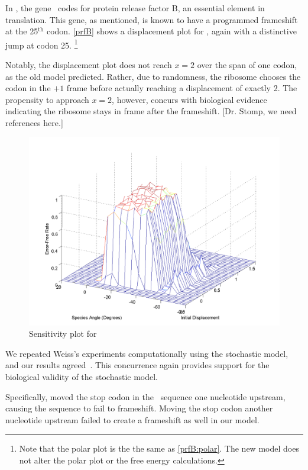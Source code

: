 \documentclass[12pt, draft]{article}
\numberwithin{equation}{section}
\begin{document}
In \ecoli, the gene \prfB\ codes for protein release factor B, an
essential element in translation.  This gene, as mentioned, is known
to have a programmed frameshift at the 25$^{\textrm{th}}$ codon.
\autoref{prfB} shows a displacement plot for
\prfB, again with a distinctive jump at codon 25.
\footnote{Note that the polar plot is the the same as \autoref{prfB:polar}. 
The new model does not alter the polar plot or the free energy calculations.}

Notably, the displacement plot does not reach $x=2$ over the span of one codon, as the old model predicted.
Rather, due to randomness, the ribosome chooses the codon in the $+1$ frame before actually reaching a displacement of exactly 2.
The propensity to approach $x=2$, however, concurs with biological
evidence indicating the ribosome stays in frame after the frameshift.
[Dr. Stomp, we need references here.]

\begin{figure}
  \centering
  \caption{Sensitivity plot for \prfB}
  \label{prfB:sens}
  \includegraphics[scale=0.4]{prfB/sensitivity}
\end{figure}

 We repeated Weiss's experiments computationally
using the stochastic model, and our results agreed~\cite{weiss87,weiss88}.
This concurrence again provides support for the biological validity of
the stochastic model.

Specifically, \citeauthor{weiss87} moved the stop codon in the
\prfB\ sequence one nucleotide upstream, causing the sequence to fail to
frameshift. Moving the stop codon another nucleotide upstream failed
to create a frameshift as well in our model.
\end{document}
